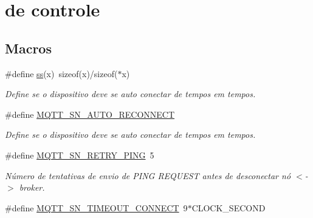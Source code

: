\hypertarget{group__Macros}{\section{de controle}
\label{group__Macros}
}
\subsection*{Macros}
\begin{DoxyCompactItemize}
\item 
\hypertarget{group__Macros_ga34bf6ae7cc029057c70910ae26a3335f}{\#define \hyperlink{group__Macros_ga34bf6ae7cc029057c70910ae26a3335f}{ss}(x)~sizeof(x)/sizeof($\ast$x)}\label{group__Macros_ga34bf6ae7cc029057c70910ae26a3335f}

\begin{DoxyCompactList}\small\item\em Define se o dispositivo deve se auto conectar de tempos em tempos. \end{DoxyCompactList}\item 
\hypertarget{group__Macros_ga8d316cee94174b8c2d16e328fdf1e607}{\#define \hyperlink{group__Macros_ga8d316cee94174b8c2d16e328fdf1e607}{M\+Q\+T\+T\+\_\+\+S\+N\+\_\+\+A\+U\+T\+O\+\_\+\+R\+E\+C\+O\+N\+N\+E\+C\+T}}\label{group__Macros_ga8d316cee94174b8c2d16e328fdf1e607}

\begin{DoxyCompactList}\small\item\em Define se o dispositivo deve se auto conectar de tempos em tempos. \end{DoxyCompactList}\item 
\hypertarget{group__Macros_ga180af20d177732dc470c147452feb30f}{\#define \hyperlink{group__Macros_ga180af20d177732dc470c147452feb30f}{M\+Q\+T\+T\+\_\+\+S\+N\+\_\+\+R\+E\+T\+R\+Y\+\_\+\+P\+I\+N\+G}~5}\label{group__Macros_ga180af20d177732dc470c147452feb30f}

\begin{DoxyCompactList}\small\item\em Número de tentativas de envio de P\+I\+N\+G R\+E\+Q\+U\+E\+S\+T antes de desconectar nó $<$-\/$>$ broker. \end{DoxyCompactList}\item 
\hypertarget{group__Macros_ga7533efb537d4d4eebf1b6d3d5256cb0b}{\#define \hyperlink{group__Macros_ga7533efb537d4d4eebf1b6d3d5256cb0b}{M\+Q\+T\+T\+\_\+\+S\+N\+\_\+\+T\+I\+M\+E\+O\+U\+T\+\_\+\+C\+O\+N\+N\+E\+C\+T}~9$\ast$C\+L\+O\+C\+K\+\_\+\+S\+E\+C\+O\+N\+D}\label{group__Macros_ga7533efb537d4d4eebf1b6d3d5256cb0b}


\end{DoxyCompactItemize}
